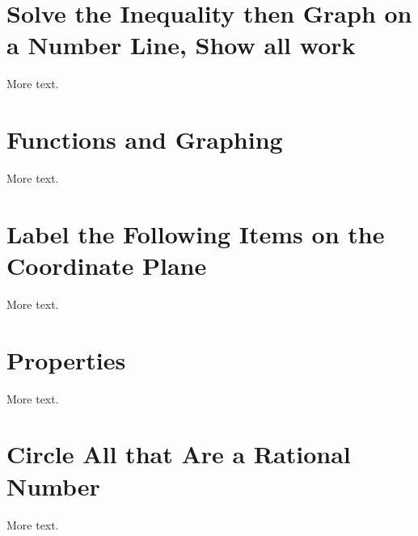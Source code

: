 \documentclass[11pt]{article} %
\begin{document}
\section{Solve the Inequality then Graph on a Number Line, Show all work}

More text.

\section{Functions and Graphing}

More text.

\section{Label the Following Items on the Coordinate Plane}

More text.

\section{Properties}

More text.

\section{Circle All that Are a Rational Number}

More text.
\end{document}
